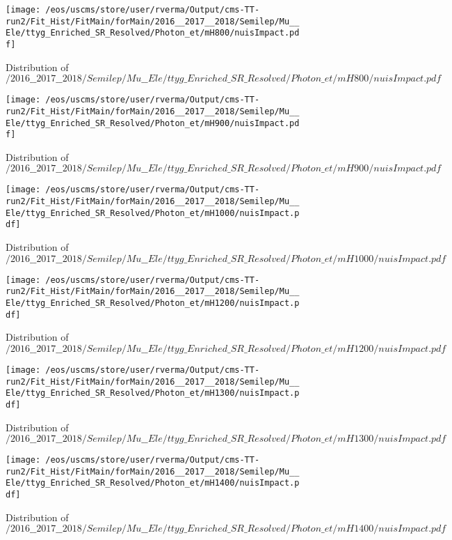 \begin{figure}
\centering
\texttt{[image: /eos/uscms/store/user/rverma/Output/cms-TT-run2/Fit\_Hist/FitMain/forMain/2016\_\_2017\_\_2018/Semilep/Mu\_\_Ele/ttyg\_Enriched\_SR\_Resolved/Photon\_et/mH800/nuisImpact.pdf]}
\caption{Distribution of $/2016\_\_2017\_\_2018/Semilep/Mu\_\_Ele/ttyg\_Enriched\_SR\_Resolved/Photon\_et/mH800/nuisImpact.pdf$}
\end{figure}

\begin{figure}
\centering
\texttt{[image: /eos/uscms/store/user/rverma/Output/cms-TT-run2/Fit\_Hist/FitMain/forMain/2016\_\_2017\_\_2018/Semilep/Mu\_\_Ele/ttyg\_Enriched\_SR\_Resolved/Photon\_et/mH900/nuisImpact.pdf]}
\caption{Distribution of $/2016\_\_2017\_\_2018/Semilep/Mu\_\_Ele/ttyg\_Enriched\_SR\_Resolved/Photon\_et/mH900/nuisImpact.pdf$}
\end{figure}

\begin{figure}
\centering
\texttt{[image: /eos/uscms/store/user/rverma/Output/cms-TT-run2/Fit\_Hist/FitMain/forMain/2016\_\_2017\_\_2018/Semilep/Mu\_\_Ele/ttyg\_Enriched\_SR\_Resolved/Photon\_et/mH1000/nuisImpact.pdf]}
\caption{Distribution of $/2016\_\_2017\_\_2018/Semilep/Mu\_\_Ele/ttyg\_Enriched\_SR\_Resolved/Photon\_et/mH1000/nuisImpact.pdf$}
\end{figure}

\begin{figure}
\centering
\texttt{[image: /eos/uscms/store/user/rverma/Output/cms-TT-run2/Fit\_Hist/FitMain/forMain/2016\_\_2017\_\_2018/Semilep/Mu\_\_Ele/ttyg\_Enriched\_SR\_Resolved/Photon\_et/mH1200/nuisImpact.pdf]}
\caption{Distribution of $/2016\_\_2017\_\_2018/Semilep/Mu\_\_Ele/ttyg\_Enriched\_SR\_Resolved/Photon\_et/mH1200/nuisImpact.pdf$}
\end{figure}

\begin{figure}
\centering
\texttt{[image: /eos/uscms/store/user/rverma/Output/cms-TT-run2/Fit\_Hist/FitMain/forMain/2016\_\_2017\_\_2018/Semilep/Mu\_\_Ele/ttyg\_Enriched\_SR\_Resolved/Photon\_et/mH1300/nuisImpact.pdf]}
\caption{Distribution of $/2016\_\_2017\_\_2018/Semilep/Mu\_\_Ele/ttyg\_Enriched\_SR\_Resolved/Photon\_et/mH1300/nuisImpact.pdf$}
\end{figure}

\begin{figure}
\centering
\texttt{[image: /eos/uscms/store/user/rverma/Output/cms-TT-run2/Fit\_Hist/FitMain/forMain/2016\_\_2017\_\_2018/Semilep/Mu\_\_Ele/ttyg\_Enriched\_SR\_Resolved/Photon\_et/mH1400/nuisImpact.pdf]}
\caption{Distribution of $/2016\_\_2017\_\_2018/Semilep/Mu\_\_Ele/ttyg\_Enriched\_SR\_Resolved/Photon\_et/mH1400/nuisImpact.pdf$}
\end{figure}

